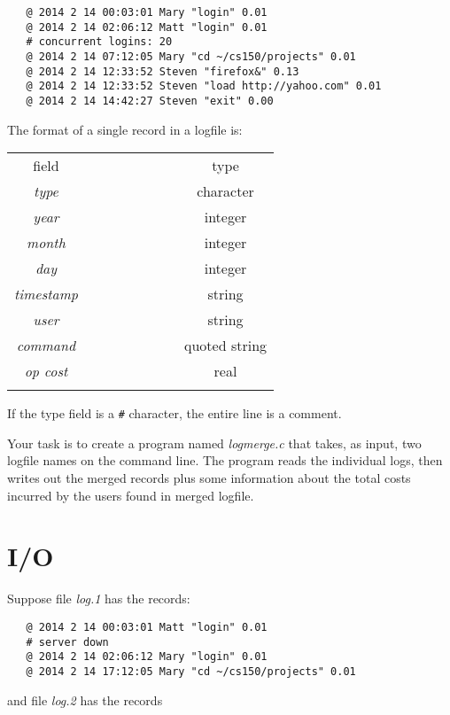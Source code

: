 \documentclass{article}
\begin{document}
\begin{verbatim}
   @ 2014 2 14 00:03:01 Mary "login" 0.01
   @ 2014 2 14 02:06:12 Matt "login" 0.01
   # concurrent logins: 20
   @ 2014 2 14 07:12:05 Mary "cd ~/cs150/projects" 0.01
   @ 2014 2 14 12:33:52 Steven "firefox&" 0.13
   @ 2014 2 14 12:33:52 Steven "load http://yahoo.com" 0.01
   @ 2014 2 14 14:42:27 Steven "exit" 0.00
\end{verbatim}

The format of a single record in a logfile is:

\begin{center}
\begin{tabular}{ccc}%
\T\toprule
    {\sc field} & ~~~~~~~~~~~ & {\sc type} \\
\T\midrule
    {\it type}       & & character\\
    {\it year}       & & integer\\
    {\it month}      & & integer\\
    {\it day}        & & integer\\
    {\it timestamp}  & & string\\
    {\it user}       & & string\\
    {\it command}    & & quoted string\\
    {\it op cost}    & & real\\
\T\bottomrule
\end{tabular}
\end{center}

If the type field is a \verb!#! character, the entire line is a comment.

Your task is to create a program named {\it logmerge.c}
that takes, as input, two
logfile names on the command line.
The program reads the individual logs,
then writes out the merged records
plus some information about the total costs incurred by
the users found in merged logfile.

\section*{I/O}

Suppose file {\it log.1} has the records:

\begin{verbatim}
   @ 2014 2 14 00:03:01 Matt "login" 0.01
   # server down
   @ 2014 2 14 02:06:12 Mary "login" 0.01
   @ 2014 2 14 17:12:05 Mary "cd ~/cs150/projects" 0.01
\end{verbatim}

and file {\it log.2} has the records
\end{document}
